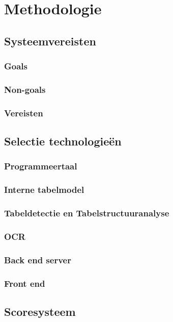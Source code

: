 
\chapter{Methodologie}
\label{ch:methodologie}


\section{Systeemvereisten}
\label{sec:systeemvereisten}

\subsection{Goals}

\subsection{Non-goals}

\subsection{Vereisten}

\section{Selectie technologieën}
\label{sec:selectie-technologieën}

\subsection{Programmeertaal}

\subsection{Interne tabelmodel}

\subsection{Tabeldetectie en Tabelstructuuranalyse}

\subsection{OCR}

\subsection{Back end server}

\subsection{Front end}

\section{Scoresysteem}
\label{sec:scoresysteem}
